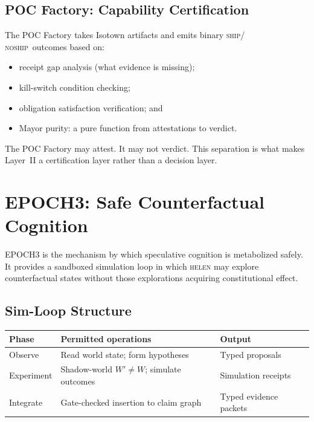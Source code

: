 \documentclass[11pt,a4paper]{article}
\theoremstyle{plain}
\theoremstyle{definition}
\theoremstyle{remark}
\newcommand{\SHIP}{\textsc{ship}}
\newcommand{\NOSHIP}{\textsc{no\textunderscore{}ship}}
\begin{document}
\subsection{POC Factory: Capability Certification}

The POC Factory takes Isotown artifacts and emits binary \SHIP / \NOSHIP\ outcomes
based on:
\begin{itemize}[nosep]
  \item receipt gap analysis (what evidence is missing);
  \item kill-switch condition checking;
  \item obligation satisfaction verification; and
  \item Mayor purity: a pure function from attestations to verdict.
\end{itemize}

The POC Factory may attest. It may not verdict.
This separation is what makes Layer~II a certification layer rather than a decision layer.

\section{EPOCH3: Safe Counterfactual Cognition}
\label{sec:epoch3}

EPOCH3 is the mechanism by which speculative cognition is metabolized safely.
It provides a sandboxed simulation loop in which \textsc{helen} may
explore counterfactual states without those explorations acquiring
constitutional effect.

\subsection{Sim-Loop Structure}

\begin{center}
\begin{tabular}{lll}
\toprule
Phase & Permitted operations & Output \\
\midrule
Observe    & Read world state; form hypotheses & Typed proposals \\
Experiment & Shadow-world $W' \neq W$; simulate outcomes & Simulation receipts \\
Integrate  & Gate-checked insertion to claim graph & Typed evidence packets \\
\bottomrule
\end{tabular}
\end{center}
\end{document}
